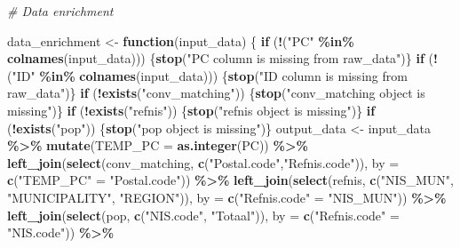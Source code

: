 \documentclass[
  english,
  11pt,
]{article}
\newenvironment{Shaded}{\begin{snugshade}}{\end{snugshade}}
\newcommand{\AttributeTok}[1]{\textcolor[rgb]{0.13,0.29,0.53}{#1}}
\newcommand{\CommentTok}[1]{\textcolor[rgb]{0.56,0.35,0.01}{\textit{#1}}}
\newcommand{\ControlFlowTok}[1]{\textcolor[rgb]{0.13,0.29,0.53}{\textbf{#1}}}
\newcommand{\FunctionTok}[1]{\textcolor[rgb]{0.13,0.29,0.53}{\textbf{#1}}}
\newcommand{\NormalTok}[1]{#1}
\newcommand{\OtherTok}[1]{\textcolor[rgb]{0.56,0.35,0.01}{#1}}
\newcommand{\SpecialCharTok}[1]{\textcolor[rgb]{0.81,0.36,0.00}{\textbf{#1}}}
\newcommand{\StringTok}[1]{\textcolor[rgb]{0.31,0.60,0.02}{#1}}
\begin{document}
\begin{Shaded}
\begin{Highlighting}[]
\CommentTok{\# Data enrichment}

\NormalTok{data\_enrichment }\OtherTok{\textless{}{-}} \ControlFlowTok{function}\NormalTok{(input\_data) \{}
    \ControlFlowTok{if}\NormalTok{ (}\SpecialCharTok{!}\NormalTok{(}\StringTok{"PC"} \SpecialCharTok{\%in\%} \FunctionTok{colnames}\NormalTok{(input\_data))) \{}\FunctionTok{stop}\NormalTok{(}\StringTok{"PC column is missing from raw\_data"}\NormalTok{)\}}
    \ControlFlowTok{if}\NormalTok{ (}\SpecialCharTok{!}\NormalTok{(}\StringTok{"ID"} \SpecialCharTok{\%in\%} \FunctionTok{colnames}\NormalTok{(input\_data))) \{}\FunctionTok{stop}\NormalTok{(}\StringTok{"ID column is missing from raw\_data"}\NormalTok{)\}}
    \ControlFlowTok{if}\NormalTok{ (}\SpecialCharTok{!}\FunctionTok{exists}\NormalTok{(}\StringTok{"conv\_matching"}\NormalTok{)) \{}\FunctionTok{stop}\NormalTok{(}\StringTok{"conv\_matching object is missing"}\NormalTok{)\}}
    \ControlFlowTok{if}\NormalTok{ (}\SpecialCharTok{!}\FunctionTok{exists}\NormalTok{(}\StringTok{"refnis"}\NormalTok{)) \{}\FunctionTok{stop}\NormalTok{(}\StringTok{"refnis object is missing"}\NormalTok{)\}}
    \ControlFlowTok{if}\NormalTok{ (}\SpecialCharTok{!}\FunctionTok{exists}\NormalTok{(}\StringTok{"pop"}\NormalTok{)) \{}\FunctionTok{stop}\NormalTok{(}\StringTok{"pop object is missing"}\NormalTok{)\}}
\NormalTok{    output\_data }\OtherTok{\textless{}{-}}\NormalTok{ input\_data }\SpecialCharTok{\%\textgreater{}\%}
        \FunctionTok{mutate}\NormalTok{(}\AttributeTok{TEMP\_PC =} \FunctionTok{as.integer}\NormalTok{(PC)) }\SpecialCharTok{\%\textgreater{}\%}
        \FunctionTok{left\_join}\NormalTok{(}\FunctionTok{select}\NormalTok{(conv\_matching, }\FunctionTok{c}\NormalTok{(}\StringTok{"Postal.code"}\NormalTok{,}\StringTok{"Refnis.code"}\NormalTok{)), }\AttributeTok{by =} \FunctionTok{c}\NormalTok{(}\StringTok{"TEMP\_PC"} \OtherTok{=} \StringTok{"Postal.code"}\NormalTok{)) }\SpecialCharTok{\%\textgreater{}\%}
        \FunctionTok{left\_join}\NormalTok{(}\FunctionTok{select}\NormalTok{(refnis, }\FunctionTok{c}\NormalTok{(}\StringTok{"NIS\_MUN"}\NormalTok{, }\StringTok{"MUNICIPALITY"}\NormalTok{, }\StringTok{"REGION"}\NormalTok{)), }\AttributeTok{by =} \FunctionTok{c}\NormalTok{(}\StringTok{"Refnis.code"} \OtherTok{=} \StringTok{"NIS\_MUN"}\NormalTok{)) }\SpecialCharTok{\%\textgreater{}\%}
        \FunctionTok{left\_join}\NormalTok{(}\FunctionTok{select}\NormalTok{(pop, }\FunctionTok{c}\NormalTok{(}\StringTok{"NIS.code"}\NormalTok{, }\StringTok{"Totaal"}\NormalTok{)), }\AttributeTok{by =} \FunctionTok{c}\NormalTok{(}\StringTok{"Refnis.code"} \OtherTok{=} \StringTok{"NIS.code"}\NormalTok{)) }\SpecialCharTok{\%\textgreater{}\%}

\end{Highlighting}
\end{Shaded}
\end{document}
